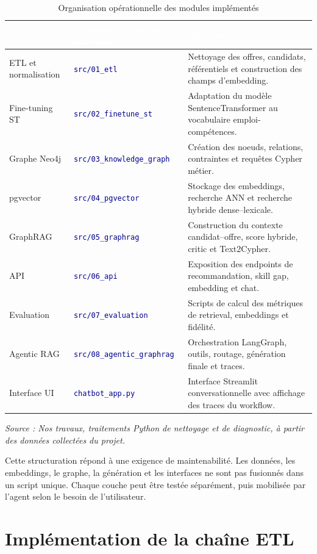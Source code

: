 \documentclass[12pt,twoside]{report}
\newcommand{\source}[1]{%
  \par\vspace{0.2\baselineskip}
  {\centering\footnotesize\itshape Source : #1\par}
}
\newcommand{\filevar}[1]{\texttt{\textcolor{darkblue}{#1}}}
\newcommand{\tabheader}[1]{\textcolor{white}{\textbf{#1}}}
\newcommand{\tableStyleStart}{%
  \small
  \renewcommand{\arraystretch}{1.12}%
  \setlength{\tabcolsep}{4pt}%
  \rowcolors{2}{lightblue!12}{white}%
}
\newcommand{\tableStyleEnd}{%
  \rowcolors{2}{}{}%
  \renewcommand{\arraystretch}{1}%
}
\begin{document}
\begin{table}[H]
  \centering
  \caption{Organisation opérationnelle des modules implémentés}
  \label{tab:modules_implementation}
  \tableStyleStart
  \begin{tabularx}{\textwidth}{p{3.6cm}p{4.3cm}X}
    \rowcolor{darkblue}
    \tabheader{Bloc} & \tabheader{Répertoire ou fichier principal} & \tabheader{Rôle dans le système} \\
    \midrule
    ETL et normalisation & \filevar{src/01\_etl} & Nettoyage des offres, candidats, référentiels et construction des champs d'embedding. \\
    Fine-tuning ST & \filevar{src/02\_finetune\_st} & Adaptation du modèle SentenceTransformer au vocabulaire emploi-compétences. \\
    Graphe Neo4j & \filevar{src/03\_knowledge\_graph} & Création des noeuds, relations, contraintes et requêtes Cypher métier. \\
    pgvector & \filevar{src/04\_pgvector} & Stockage des embeddings, recherche ANN et recherche hybride dense--lexicale. \\
    GraphRAG & \filevar{src/05\_graphrag} & Construction du contexte candidat--offre, score hybride, critic et Text2Cypher. \\
    API & \filevar{src/06\_api} & Exposition des endpoints de recommandation, skill gap, embedding et chat. \\
    Evaluation & \filevar{src/07\_evaluation} & Scripts de calcul des métriques de retrieval, embeddings et fidélité. \\
    Agentic RAG & \filevar{src/08\_agentic\_graphrag} & Orchestration LangGraph, outils, routage, génération finale et traces. \\
    Interface UI & \filevar{chatbot\_app.py} & Interface Streamlit conversationnelle avec affichage des traces du workflow. \\
    \bottomrule
  \end{tabularx}
  \tableStyleEnd
  \source{Nos travaux, traitements Python de nettoyage et de diagnostic, à partir des données collectées du projet.}
\end{table}

Cette structuration répond à une exigence de maintenabilité. Les données, les embeddings, le graphe, la génération et les interfaces ne sont pas fusionnés dans un script unique. Chaque couche peut être testée séparément, puis mobilisée par l'agent selon le besoin de l'utilisateur.

\section{Implémentation de la chaîne ETL}
\end{document}
